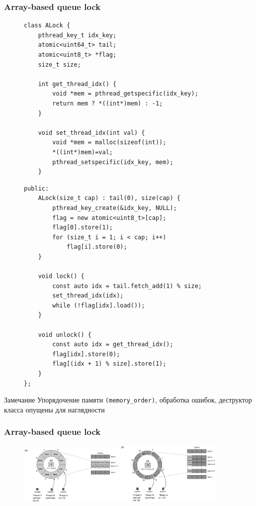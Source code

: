 \documentclass[aspectratio=169, pdf, 8pt, unicode]{beamer}
\begin{document}
\begin{frame}[fragile]
\frametitle{Array-based queue lock}
\begin{figure}[H]
\begin{minipage}{0.4\textwidth}
\small
\begin{verbatim}
class ALock {
    pthread_key_t idx_key;
    atomic<uint64_t> tail;
    atomic<uint8_t> *flag;
    size_t size;

    int get_thread_idx() {
        void *mem = pthread_getspecific(idx_key);
        return mem ? *((int*)mem) : -1;
    }

    void set_thread_idx(int val) {
        void *mem = malloc(sizeof(int));
        *((int*)mem)=val;
        pthread_setspecific(idx_key, mem);
    }
\end{verbatim}
\end{minipage}
\hspace{0.05\textwidth}
\begin{minipage}{0.5\textwidth}
\small
\begin{verbatim}
public:
    ALock(size_t cap) : tail(0), size(cap) {
        pthread_key_create(&idx_key, NULL);
        flag = new atomic<uint8_t>[cap];
        flag[0].store(1);
        for (size_t i = 1; i < cap; i++)
            flag[i].store(0);
    }

    void lock() {
        const auto idx = tail.fetch_add(1) % size;
        set_thread_idx(idx);
        while (!flag[idx].load());
    }

    void unlock() {
        const auto idx = get_thread_idx();
        flag[idx].store(0);
        flag[(idx + 1) % size].store(1);
    }
};
\end{verbatim}
\end{minipage}
\end{figure}
\begin{alertblock}{Замечание}
Упорядочение памяти \texttt{(memory\_order)}, обработка ошибок, деструктор класса опущены для наглядности
\end{alertblock}
\end{frame}

\begin{frame}[fragile]
\frametitle{Array-based queue lock}
\begin{figure}[H]
\centering
\includegraphics[width=0.45\textwidth]{fig/alock_padding-a.png}
\includegraphics[width=0.45\textwidth]{fig/alock_padding-b.png}
\end{figure}
\end{frame}
\end{document}
